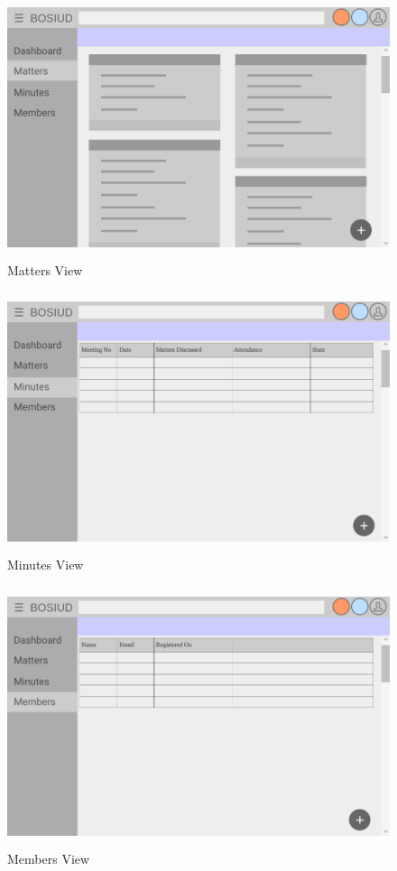 \documentclass[a4paper,beamer]{article}
\begin{document}
		\begin{figure}[h!]
			\begin{center}
			\includegraphics[width=5in,height=3in]{img/ui-matters}
			\end{center}
			\caption{Matters View}
			\label{fig:ui-matters}
		\end{figure}

		\begin{figure}[h!]
			\begin{center}
			\includegraphics[width=5in,height=3in]{img/ui-minutes}
			\end{center}
			\caption{Minutes View}
			\label{fig:ui-minutes}
		\end{figure}
		
		\begin{figure}[h!]
			\begin{center}
			\includegraphics[width=5in,height=3in]{img/ui-members}
			\end{center}
			\caption{Members View}
			\label{fig:ui-members}
		\end{figure}
		
\end{document}
